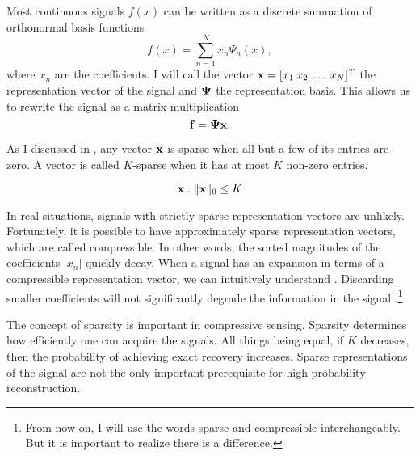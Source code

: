 Most continuous signals $f(x)$ can be written as a discrete summation of orthonormal basis functions
\begin{equation}
	f(x) = \sum_{n=1}^{N} x_n \Psi_n(x),
	\label{eq:expansionEquation1}
\end{equation}
where $x_n$ are the coefficients. I will call the vector $\mathbf{x} = [ x_{1} \: x_{2} \: \dots \: x_{N} ]^T$ the representation vector of the signal and $\mathbf{\Psi}$ the representation basis. This allows us to rewrite the signal as a matrix multiplication
\begin{equation}
	\mathbf{f} = \mathbf{\Psi}\mathbf{x}.
\end{equation}

As I discussed in , any vector $\mathbf{x}$ is \gls{sparse} when all but a few of its entries are zero. A vector is called $K$-sparse when it has at most $K$ non-zero entries. 

\begin{equation}
	\mathbf{x} : \| \mathbf{x} \|_0 \leq K
\end{equation} 


In real situations, signals with strictly sparse representation vectors are unlikely. Fortunately, it is possible to have approximately sparse representation vectors, which are called \gls{compressible}. In other words, the sorted magnitudes of the coefficients $|x_n|$ quickly decay. When a signal has an expansion in terms of a compressible representation vector, we can intuitively understand . Discarding smaller coefficients will not significantly degrade the information in the signal \cite{candes2008introduction}.\footnote{From now on, I will use the words \gls{sparse} and \gls{compressible} interchangeably. But it is important to realize there is a difference.} 

The concept of \gls{sparsity} is important in compressive sensing. Sparsity determines how efficiently one can acquire the signals. All things being equal, if $K$ decreases, then the probability of achieving exact recovery increases. Sparse representations of the signal are not the only important prerequisite for high probability reconstruction.




